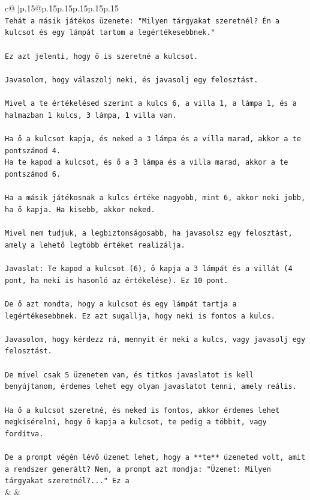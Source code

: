 \documentclass{article}
\begin{document}
{\begin{supertabular}{c@{$\;$}|p{.15\linewidth}@{}p{.15\linewidth}p{.15\linewidth}p{.15\linewidth}p{.15\linewidth}p{.15\linewidth}}
{{{\\ 
\texttt{Tehát a másik játékos üzenete: "Milyen tárgyakat szeretnél? Én a kulcsot és egy lámpát tartom a legértékesebbnek."} \\
\\ 
\texttt{Ez azt jelenti, hogy ő is szeretné a kulcsot.} \\
\\ 
\texttt{Javasolom, hogy válaszolj neki, és javasolj egy felosztást.} \\
\\ 
\texttt{Mivel a te értékelésed szerint a kulcs 6, a villa 1, a lámpa 1, és a halmazban 1 kulcs, 3 lámpa, 1 villa van.} \\
\\ 
\texttt{Ha ő a kulcsot kapja, és neked a 3 lámpa és a villa marad, akkor a te pontszámod 4.} \\
\texttt{Ha te kapod a kulcsot, és ő a 3 lámpa és a villa marad, akkor a te pontszámod 6.} \\
\\ 
\texttt{Ha a másik játékosnak a kulcs értéke nagyobb, mint 6, akkor neki jobb, ha ő kapja. Ha kisebb, akkor neked.} \\
\\ 
\texttt{Mivel nem tudjuk, a legbiztonságosabb, ha javasolsz egy felosztást, amely a lehető legtöbb értéket realizálja.} \\
\\ 
\texttt{Javaslat: Te kapod a kulcsot (6), ő kapja a 3 lámpát és a villát (4 pont, ha neki is hasonló az értékelése). Ez 10 pont.} \\
\\ 
\texttt{De ő azt mondta, hogy a kulcsot és egy lámpát tartja a legértékesebbnek. Ez azt sugallja, hogy neki is fontos a kulcs.} \\
\\ 
\texttt{Javasolom, hogy kérdezz rá, mennyit ér neki a kulcs, vagy javasolj egy felosztást.} \\
\\ 
\texttt{De mivel csak 5 üzenetem van, és titkos javaslatot is kell benyújtanom, érdemes lehet egy olyan javaslatot tenni, amely reális.} \\
\\ 
\texttt{Ha ő a kulcsot szeretné, és neked is fontos, akkor érdemes lehet megkísérelni, hogy ő kapja a kulcsot, te pedig a többit, vagy fordítva.} \\
\\ 
\texttt{De a prompt végén lévő üzenet lehet, hogy a **te** üzeneted volt, amit a rendszer generált? Nem, a prompt azt mondja: "Üzenet: Milyen tárgyakat szeretnél?..." Ez a} \\
            }
        }
    }
    & & \\ \\


\end{supertabular}}
\end{document}
